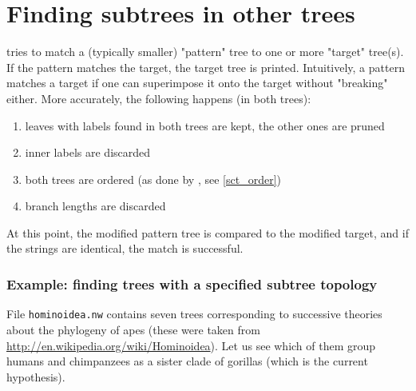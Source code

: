\section{Finding subtrees in other trees}
\label{sct_match}

\match{} tries to match a (typically smaller) "pattern" tree to one or more
"target" tree(s). If the pattern matches the target, the target tree is
printed. Intuitively, a pattern matches a target if one can superimpose it onto
the target without "breaking" either. More accurately, the following happens
(in both trees):
\begin{enumerate}
	\item leaves with labels found in both trees are kept, the other ones are
		pruned
	\item inner labels are discarded
	\item both trees are ordered (as done by \order{}, see  \ref{sct_order})
	\item branch lengths are discarded
\end{enumerate}
At this point, the modified pattern tree is compared to the modified target, and if the \nw{} strings are identical, the match is successful.

\subsubsection{Example: finding trees with a specified  subtree topology}

File \texttt{hominoidea.nw} contains seven trees corresponding to successive
theories about the phylogeny of apes (these were taken from
\url{http://en.wikipedia.org/wiki/Hominoidea}). Let us see which of them group
humans and chimpanzees as a sister clade of gorillas (which is the current
hypothesis).


